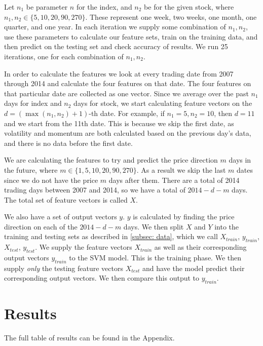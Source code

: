 \documentclass[pageno]{jpaper}
\begin{document}
Let $n_1$ be parameter $n$ for the index, and $n_2$ be for the given stock, where $n_1, n_2 \in \{5, 10, 20, 90, 270\}$. These represent one week, two weeks, one month, one quarter, and one year. In each iteration we supply some combination of $n_1, n_2$, use these parameters to calculate our feature sets, train on the training data, and then predict on the testing set and check accuracy of results. We run 25 iterations, one for each combination of $n_1, n_2$.

In order to calculate the features we look at every trading date from 2007 through 2014 and calculate the four features on that date. The four features on that particular date are collected as one vector. Since we average over the past $n_1$ days for index and $n_2$ days for stock, we start calculating feature vectors on the $d = (\max(n_1, n_2) + 1)$-th date. For example, if $n_1 = 5, n_2 = 10$, then $d=11$ and we start from the 11th date. This is because we skip the first date, as volatility and momentum are both calculated based on the previous day's data, and there is no data before the first date. 

We are calculating the features to try and predict the price direction $m$ days in the future, where $m \in \{1, 5, 10, 20, 90, 270\}$. As a result we skip the last $m$ dates since we do not have the price $m$ days after them. There are a total of 2014 trading days between 2007 and 2014, so we have a total of $2014 - d - m$ days. The total set of feature vectors is called $X$.

We also have a set of output vectors $y$. $y$ is calculated by finding the price direction on each of the $2014-d-m$ days. We then split $X$ and $Y$ into the training and testing sets as described in \ref{subsec: data}, which we call $X_{train}$, $y_{train}$, $X_{test}$, $y_{test}$. We supply the feature vectors $X_{train}$ as well as their corresponding output vectors $y_{train}$ to the SVM model. This is the training phase. We then supply {\em only} the testing feature vectors $X_{test}$ and have the model predict their corresponding output vectors. We then compare this output to $y_{train}$.

\newpage
\section{Results}
\label{sec: results}
The full table of results can be found in the Appendix.


\end{document}
